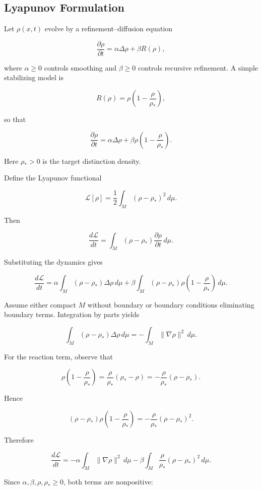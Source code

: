\documentclass[12pt,twoside,openright]{book}
\begin{document}
\subsection{Lyapunov Formulation}

Let \(\rho(x,t)\) evolve by a refinement--diffusion
equation

\[
\frac{\partial \rho}{\partial t}
=
\alpha \Delta\rho
+
\beta R(\rho),
\]

where \(\alpha\ge0\) controls smoothing and \(\beta\ge0\)
controls recursive refinement. A simple stabilizing model
is

\[
R(\rho)=\rho\left(1-\frac{\rho}{\rho_*}\right),
\]

so that

\[
\frac{\partial \rho}{\partial t}
=
\alpha\Delta\rho
+
\beta\rho\left(1-\frac{\rho}{\rho_*}\right).
\]

Here \(\rho_*>0\) is the target distinction density.

Define the Lyapunov functional

\[
\mathcal L[\rho]
=
\frac12
\int_M
(\rho-\rho_*)^2
\,d\mu.
\]

Then

\[
\frac{d\mathcal L}{dt}
=
\int_M
(\rho-\rho_*)
\frac{\partial\rho}{\partial t}
\,d\mu.
\]

Substituting the dynamics gives

\[
\frac{d\mathcal L}{dt}
=
\alpha
\int_M
(\rho-\rho_*)\Delta\rho
\,d\mu
+
\beta
\int_M
(\rho-\rho_*)
\rho\left(1-\frac{\rho}{\rho_*}\right)
\,d\mu.
\]

Assume either compact \(M\) without boundary or boundary
conditions eliminating boundary terms. Integration by parts
yields

\[
\int_M
(\rho-\rho_*)\Delta\rho
\,d\mu
=
-\int_M
\|\nabla\rho\|^2
\,d\mu.
\]

For the reaction term, observe that

\[
\rho\left(1-\frac{\rho}{\rho_*}\right)
=
\frac{\rho}{\rho_*}(\rho_*-\rho)
=
-\frac{\rho}{\rho_*}(\rho-\rho_*).
\]

Hence

\[
(\rho-\rho_*)
\rho\left(1-\frac{\rho}{\rho_*}\right)
=
-\frac{\rho}{\rho_*}(\rho-\rho_*)^2.
\]

Therefore

\[
\frac{d\mathcal L}{dt}
=
-\alpha
\int_M
\|\nabla\rho\|^2
\,d\mu
-
\beta
\int_M
\frac{\rho}{\rho_*}
(\rho-\rho_*)^2
\,d\mu.
\]

Since \(\alpha,\beta,\rho,\rho_*\ge0\), both terms are
nonpositive:
\end{document}
